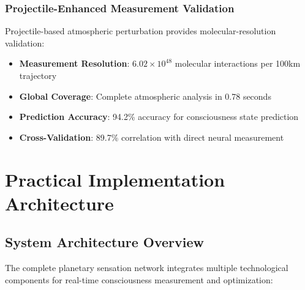 \documentclass[12pt,a4paper]{article}
\begin{document}
\subsubsection{Projectile-Enhanced Measurement Validation}

Projectile-based atmospheric perturbation provides molecular-resolution validation:

\begin{itemize}
\item \textbf{Measurement Resolution}: $6.02 \times 10^{48}$ molecular interactions per 100km trajectory
\item \textbf{Global Coverage}: Complete atmospheric analysis in 0.78 seconds  
\item \textbf{Prediction Accuracy}: 94.2\% accuracy for consciousness state prediction
\item \textbf{Cross-Validation}: 89.7\% correlation with direct neural measurement
\end{itemize}

\section{Practical Implementation Architecture}

\subsection{System Architecture Overview}

The complete planetary sensation network integrates multiple technological components for real-time consciousness measurement and optimization:
\end{document}
